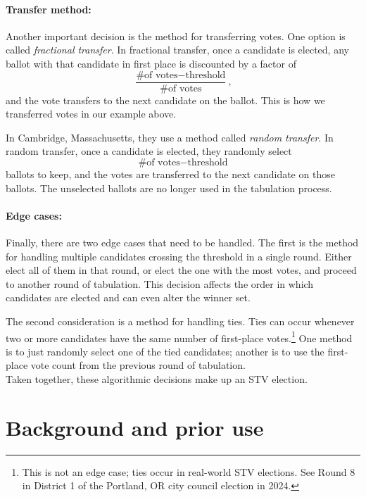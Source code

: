 \documentclass{amsart}
\theoremstyle{definition}
\begin{document}
\paragraph{\bf{Transfer method:}}
Another important decision is the method for transferring votes. 
One option is called \emph{fractional transfer}. In fractional transfer, once a candidate is elected,
any ballot with that candidate in first place is discounted by a factor of 
\[\frac{\text{\# of votes}- \text{threshold}}{\text{\# of votes}},\]
and the vote transfers to the next candidate on the ballot.
This is how we transferred votes in our example above.

In Cambridge, Massachusetts, they use a method called \emph{random transfer}.
In random transfer, once a candidate is elected, they randomly select 
\[\text{\# of votes}- \text{threshold}\]
ballots to keep, and the votes are transferred to the next candidate on those ballots.
The unselected ballots are no longer used in the tabulation process.\\


\paragraph{\bf{Edge cases:}}
Finally, there are two edge cases that need to be handled.
The first is the method for handling  multiple candidates 
crossing the threshold in a single round. Either elect all of them in that round,
or elect the one with the most votes, and proceed to another round of tabulation.
This decision affects the order in which candidates are elected and can even 
alter the winner set.

The second consideration is a method for handling ties. Ties can occur whenever two or more
candidates have the same number of first-place votes.\footnote{This is not an edge case; ties occur 
in real-world STV elections. See Round 8 in District 1 of the Portland, OR city council election in 2024.}
One method is to just randomly select one of the tied candidates; another is to use the 
first-place vote count from the previous round of tabulation. \\ 

Taken together, these algorithmic decisions make up an STV election.






\section{Background and prior use}
\end{document}
